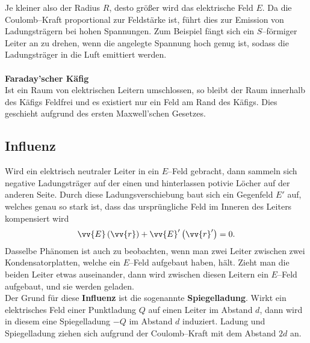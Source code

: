Je kleiner also der Radius $R$, desto größer wird das elektrische Feld $E$. Da die Coulomb--Kraft proportional zur Feldstärke ist, führt dies zur Emission von Ladungsträgern bei hohen Spannungen. Zum Beispiel fängt sich ein $S$--förmiger Leiter an zu drehen, wenn die angelegte Spannung hoch genug ist, sodass die Ladungsträger in die Luft emittiert werden.
\\\hfill\\\textbf{Faraday'scher Käfig}\\ 
Ist ein Raum von elektrischen Leitern umschlossen, so bleibt der Raum innerhalb des Käfigs Feldfrei und es existiert nur ein Feld am Rand des Käfigs. Dies geschieht aufgrund des ersten Maxwell'schen Gesetzes.

\subsection{Influenz}
Wird ein elektrisch neutraler Leiter in ein $E$--Feld gebracht, dann sammeln sich negative Ladungsträger auf der einen und hinterlassen potivie Löcher auf der anderen Seite. Durch diese Ladungsverschiebung baut sich ein Gegenfeld $E'$ auf, welches genau so stark ist, dass das ursprüngliche Feld im Inneren des Leiters kompensiert wird
\[ 
        \vv{E}\left(\vv{r}\right)+\vv{E}'\left(\vv{r}'\right)=0
.\] 
Dasselbe Phänomen ist auch zu beobachten, wenn man zwei Leiter zwischen zwei Kondensatorplatten, welche ein $E$--Feld aufgebaut haben, hält. Zieht man die beiden Leiter etwas auseinander, dann wird zwischen diesen Leitern ein $E$--Feld aufgebaut, und sie werden geladen.\\\indent
Der Grund für diese \textbf{Influenz} ist die sogenannte \textbf{Spiegelladung}. Wirkt ein elektrisches Feld einer Punktladung $Q$ auf einen Leiter im Abstand $d$, dann wird in diesem eine Spiegelladung $-Q$ im Abstand $d$ induziert. Ladung und Spiegelladung ziehen sich aufgrund der Coulomb--Kraft mit dem Abstand $2d$ an.

